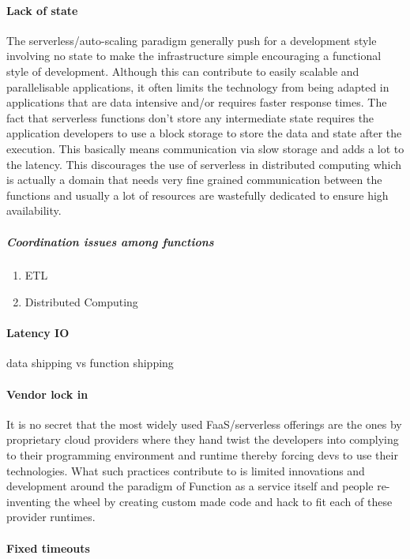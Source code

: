 \documentclass[12pt,titlepage]{article}
\begin{document}
\paragraph{Lack of state}
\label{sec:org009c8a2}
The serverless/auto-scaling paradigm generally push for a development style
involving no state to make the infrastructure simple encouraging a functional
style of development. Although this can contribute to easily scalable and
parallelisable applications, it often limits the technology from being adapted
in applications that are data intensive and/or requires faster response times.
The fact that serverless functions don't store any intermediate state requires
the application developers to use a block storage to store the data and state
after the execution. This basically means communication via slow storage and
adds a lot to the latency. This discourages the use of serverless in distributed
computing which is actually a domain that needs very fine grained communication
between the functions and usually a lot of resources are wastefully dedicated to
ensure high availability.
\subparagraph{Coordination issues among functions}
\label{sec:orgbbbd43c}
\begin{enumerate}
\item ETL
\label{sec:org7ea15d6}
\item Distributed Computing
\label{sec:org741f305}
\end{enumerate}
\paragraph{Latency IO}
\label{sec:orgbbdf0a2}
data shipping vs function shipping
\paragraph{Vendor lock in}
\label{sec:orgccc7ba8}
It is no secret that the most widely used FaaS/serverless offerings are the ones by
proprietary cloud providers where they hand twist the developers into complying
to their programming environment and runtime thereby forcing devs to use their
technologies. What such practices contribute to is limited innovations and
development around the paradigm of Function as a service itself and people
re-inventing the wheel by creating custom made code and hack to fit each of
these provider runtimes.
\paragraph{Fixed timeouts}
\label{sec:org2da74b9}
\end{document}
